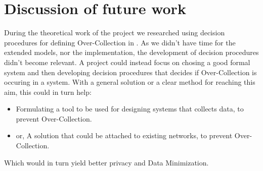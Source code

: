 









\section{Discussion of future work}

During the theoretical work of the project we researched using decision procedures for defining Over-Collection in \wsns. As we didn't have time for the extended models, nor the implementation, the development of decision procedures didn't become relevant. A project could instead focus on chosing a good formal system and then developing decision procedures that decides if Over-Collection is occuring in a system. With a general solution or a clear method for reaching this aim, this could in turn help:

\begin{itemize}
\item Formulating a tool to be used for designing systems that collects data, to prevent Over-Collection.
\item or, A solution that could be attached to existing networks, to prevent Over-Collection.
\end{itemize}

Which would in turn yield better privacy and Data Minimization.


